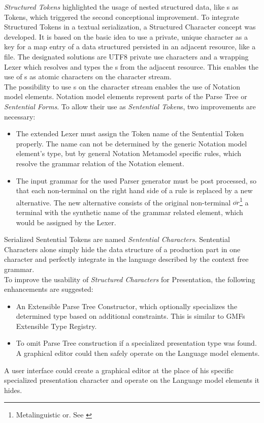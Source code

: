 \emph{Structured Tokens} highlighted the usage of nested structured data, like s as Tokens, which triggered the second conceptional improvement. To integrate Structured Tokens in a textual serialization, a Structured Character concept was developed. It is based on the basic idea to use a private, unique character as a key for a map entry of a data structured persisted in an adjacent resource, like a file. The designated solutions are UTF8 private use characters and a wrapping Lexer which resolves and types the s from the adjacent resource. This enables the use of s as atomic characters on the character stream. \\

The possibility to use s on the character stream enables the use of Notation model elements. Notation model elements represent parts of the Parse Tree or \emph{Sentential Forms}. To allow their use as \emph{Sentential Token}s, two improvements are necessary:
\begin{itemize}
	\item The extended Lexer must assign the Token name of the Sentential Token properly. The name can not be determined by the generic Notation model element's type, but by general Notation Metamodel specific rules, which resolve the grammar relation of the Notation element.
	\item The input grammar for the used Parser generator must be post processed, so that each non-terminal on the right hand side of a rule is replaced by a new alternative. The new alternative consists of the original non-terminal $\overline{or}$\footnote{\raggedright Metalinguistic or. See \cite{BNF}} a terminal with the synthetic name of the grammar related element, which would be assigned by the Lexer.
\end{itemize}
Serialized Sentential Tokens are named \emph{Sentential Characters}. Sentential Characters alone simply hide the data structure of a production part in one character and perfectly integrate in the language described by the context free grammar. \\

To improve the usability of \emph{Structured Characters} for Presentation, the following enhancements are suggested:
\begin{itemize}
	\item An Extensible Parse Tree Constructor, which optionally specializes the determined type based on additional constraints. This is similar to GMFs Extensible Type Registry.
	\item To omit Parse Tree construction if a specialized presentation type was found. A graphical editor could then safely operate on the Language model elements.
\end{itemize}
A user interface could create a graphical editor at the place of his specific specialized presentation character and operate on the Language model elements it hides.\\


